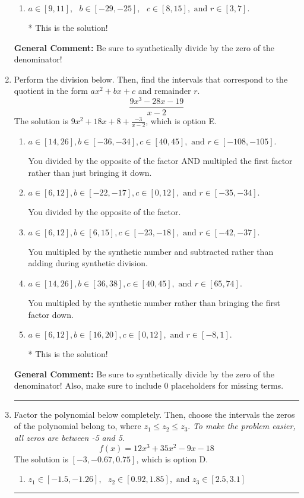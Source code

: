 \documentclass{extbook}[14pt]
\newcommand{\litem}[1]{\item #1

\rule{\textwidth}{0.4pt}}
\begin{document}
\begin{enumerate}
{\begin{enumerate}[label=\Alph*.]
 You multiplied by the synthetic number rather than bringing the first factor down.
\item \( a \in [9, 11], \text{   } b \in [-29, -25], \text{   } c \in [8, 15], \text{   and   } r \in [3, 7]. \)

* This is the solution!
\end{enumerate}

\textbf{General Comment:} Be sure to synthetically divide by the zero of the denominator!
}
\litem{
Perform the division below. Then, find the intervals that correspond to the quotient in the form $ax^2+bx+c$ and remainder $r$.
\[ \frac{9x^{3} -28 x -19}{x -2} \]The solution is \( 9x^{2} +18 x + 8 + \frac{-3}{x -2} \), which is option E.\begin{enumerate}[label=\Alph*.]
\item \( a \in [14, 26], b \in [-36, -34], c \in [40, 45], \text{ and } r \in [-108, -105]. \)

 You divided by the opposite of the factor AND multipled the first factor rather than just bringing it down.
\item \( a \in [6, 12], b \in [-22, -17], c \in [0, 12], \text{ and } r \in [-35, -34]. \)

 You divided by the opposite of the factor.
\item \( a \in [6, 12], b \in [6, 15], c \in [-23, -18], \text{ and } r \in [-42, -37]. \)

 You multipled by the synthetic number and subtracted rather than adding during synthetic division.
\item \( a \in [14, 26], b \in [36, 38], c \in [40, 45], \text{ and } r \in [65, 74]. \)

 You multipled by the synthetic number rather than bringing the first factor down.
\item \( a \in [6, 12], b \in [16, 20], c \in [0, 12], \text{ and } r \in [-8, 1]. \)

* This is the solution!
\end{enumerate}

\textbf{General Comment:} Be sure to synthetically divide by the zero of the denominator! Also, make sure to include 0 placeholders for missing terms.
}
\litem{
Factor the polynomial below completely. Then, choose the intervals the zeros of the polynomial belong to, where $z_1 \leq z_2 \leq z_3$. \textit{To make the problem easier, all zeros are between -5 and 5.}
\[ f(x) = 12x^{3} +35 x^{2} -9 x -18 \]The solution is \( [-3, -0.67, 0.75] \), which is option D.\begin{enumerate}[label=\Alph*.]
\item \( z_1 \in [-1.5, -1.26], \text{   }  z_2 \in [0.92, 1.85], \text{   and   } z_3 \in [2.5, 3.1] \)


\end{enumerate}}
\end{enumerate}
\end{document}
